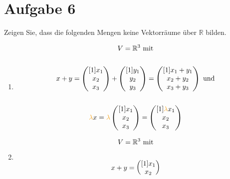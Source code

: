 \documentclass[main.tex]{subfiles}
\begin{document}
\section{Aufgabe 6}
Zeigen Sie, dass die folgenden Mengen keine Vektorräume über $\mathbb{R}$ bilden.

\begin{enumerate}
    \item \begin{gather*}
        V=\mathbb{R}^{3}\text{ mit} \notag\\
        \notag\\
        x+y=\begin{pmatrix}[1]
        x_{1}\\
        x_{2}\\
        x_{3}
        \end{pmatrix} +\begin{pmatrix}[1]
        y_{1}\\
        y_{2}\\
        y_{3}
        \end{pmatrix} =\begin{pmatrix}[1]
        x_{1} +y_{1}\\
        x_{2} +y_{2}\\
        x_{3} +y_{3}
        \end{pmatrix}\text{ und} \notag\\
        \notag\\
        \textcolor[rgb]{0.96,0.65,0.14}{\lambda } x=\textcolor[rgb]{0.96,0.65,0.14}{\lambda }\begin{pmatrix}[1]
        x_{1}\\
        x_{2}\\
        x_{3}
        \end{pmatrix} =\begin{pmatrix}[1]
        \textcolor[rgb]{0.96,0.65,0.14}{\lambda } x_{1}\\
        x_{2}\\
        x_{3}
        \end{pmatrix}
    \end{gather*}
    \item \begin{gather*}
        V=\mathbb{R}^{3}\text{ mit} \notag\\
        \notag\\
        x+y=\begin{pmatrix}[1]
        x_{1}\\
        x_{2}\\

\end{pmatrix}
\end{gather*}
\end{enumerate}
\end{document}
